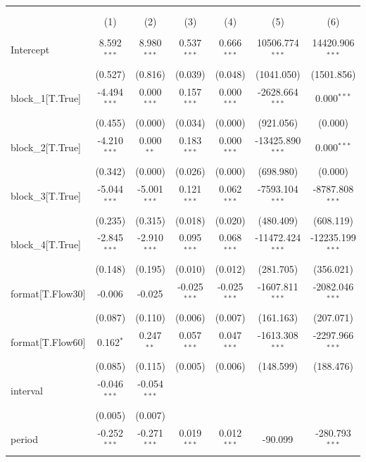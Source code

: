 \begin{table}[!htbp] \centering
\begin{tabular}{@{\extracolsep{5pt}}lcccccc}
\\[-1.8ex]\hline
\hline \\[-1.8ex]
\\[-1.8ex] & (1) & (2) & (3) & (4) & (5) & (6) \\
\hline \\[-1.8ex]
 Intercept & 8.592$^{***}$ & 8.980$^{***}$ & 0.537$^{***}$ & 0.666$^{***}$ & 10506.774$^{***}$ & 14420.906$^{***}$ \\
& (0.527) & (0.816) & (0.039) & (0.048) & (1041.050) & (1501.856) \\
 block_1[T.True] & -4.494$^{***}$ & 0.000$^{***}$ & 0.157$^{***}$ & 0.000$^{***}$ & -2628.664$^{***}$ & 0.000$^{***}$ \\
& (0.455) & (0.000) & (0.034) & (0.000) & (921.056) & (0.000) \\
 block_2[T.True] & -4.210$^{***}$ & 0.000$^{**}$ & 0.183$^{***}$ & 0.000$^{***}$ & -13425.890$^{***}$ & 0.000$^{***}$ \\
& (0.342) & (0.000) & (0.026) & (0.000) & (698.980) & (0.000) \\
 block_3[T.True] & -5.044$^{***}$ & -5.001$^{***}$ & 0.121$^{***}$ & 0.062$^{***}$ & -7593.104$^{***}$ & -8787.808$^{***}$ \\
& (0.235) & (0.315) & (0.018) & (0.020) & (480.409) & (608.119) \\
 block_4[T.True] & -2.845$^{***}$ & -2.910$^{***}$ & 0.095$^{***}$ & 0.068$^{***}$ & -11472.424$^{***}$ & -12235.199$^{***}$ \\
& (0.148) & (0.195) & (0.010) & (0.012) & (281.705) & (356.021) \\
 format[T.Flow30] & -0.006$^{}$ & -0.025$^{}$ & -0.025$^{***}$ & -0.025$^{***}$ & -1607.811$^{***}$ & -2082.046$^{***}$ \\
& (0.087) & (0.110) & (0.006) & (0.007) & (161.163) & (207.071) \\
 format[T.Flow60] & 0.162$^{*}$ & 0.247$^{**}$ & 0.057$^{***}$ & 0.047$^{***}$ & -1613.308$^{***}$ & -2297.966$^{***}$ \\
& (0.085) & (0.115) & (0.005) & (0.006) & (148.599) & (188.476) \\
 interval & -0.046$^{***}$ & -0.054$^{***}$ & & & & \\
& (0.005) & (0.007) & & & & \\
 period & -0.252$^{***}$ & -0.271$^{***}$ & 0.019$^{***}$ & 0.012$^{***}$ & -90.099$^{}$ & -280.793$^{***}$ \\

\end{tabular}
\end{table}
